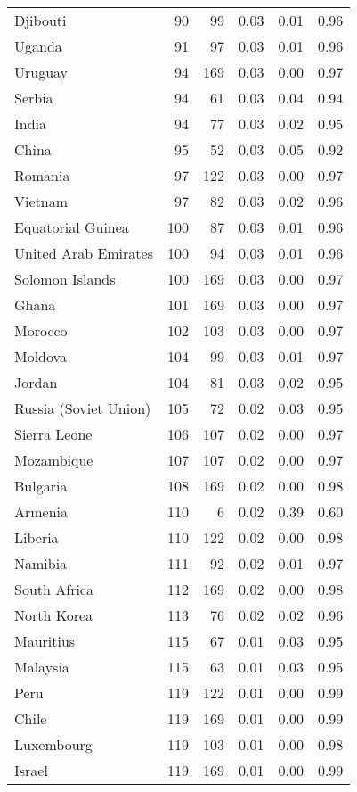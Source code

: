 \begin{longtable}[t]{lrrrrr}
Djibouti & 90 & 99 & 0.03 & 0.01 & 0.96\\
\addlinespace
Uganda & 91 & 97 & 0.03 & 0.01 & 0.96\\
Uruguay & 94 & 169 & 0.03 & 0.00 & 0.97\\
Serbia & 94 & 61 & 0.03 & 0.04 & 0.94\\
India & 94 & 77 & 0.03 & 0.02 & 0.95\\
China & 95 & 52 & 0.03 & 0.05 & 0.92\\
\addlinespace
Romania & 97 & 122 & 0.03 & 0.00 & 0.97\\
Vietnam & 97 & 82 & 0.03 & 0.02 & 0.96\\
Equatorial Guinea & 100 & 87 & 0.03 & 0.01 & 0.96\\
United Arab Emirates & 100 & 94 & 0.03 & 0.01 & 0.96\\
Solomon Islands & 100 & 169 & 0.03 & 0.00 & 0.97\\
\addlinespace
Ghana & 101 & 169 & 0.03 & 0.00 & 0.97\\
Morocco & 102 & 103 & 0.03 & 0.00 & 0.97\\
Moldova & 104 & 99 & 0.03 & 0.01 & 0.97\\
Jordan & 104 & 81 & 0.03 & 0.02 & 0.95\\
Russia (Soviet Union) & 105 & 72 & 0.02 & 0.03 & 0.95\\
\addlinespace
Sierra Leone & 106 & 107 & 0.02 & 0.00 & 0.97\\
Mozambique & 107 & 107 & 0.02 & 0.00 & 0.97\\
Bulgaria & 108 & 169 & 0.02 & 0.00 & 0.98\\
Armenia & 110 & 6 & 0.02 & 0.39 & 0.60\\
Liberia & 110 & 122 & 0.02 & 0.00 & 0.98\\
\addlinespace
Namibia & 111 & 92 & 0.02 & 0.01 & 0.97\\
South Africa & 112 & 169 & 0.02 & 0.00 & 0.98\\
North Korea & 113 & 76 & 0.02 & 0.02 & 0.96\\
Mauritius & 115 & 67 & 0.01 & 0.03 & 0.95\\
Malaysia & 115 & 63 & 0.01 & 0.03 & 0.95\\
\addlinespace
Peru & 119 & 122 & 0.01 & 0.00 & 0.99\\
Chile & 119 & 169 & 0.01 & 0.00 & 0.99\\
Luxembourg & 119 & 103 & 0.01 & 0.00 & 0.98\\
Israel & 119 & 169 & 0.01 & 0.00 & 0.99\\

\end{longtable}
